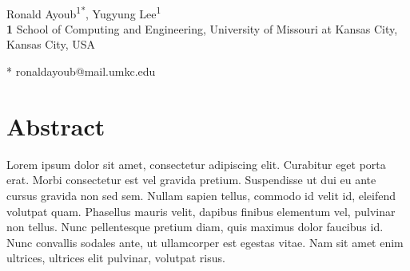 \documentclass[10pt,letterpaper]{article}
\begin{document}
\vspace*{0.2in}

\begin{flushleft}
{\Large
\textbf{} %
}
\newline
\\
Ronald Ayoub\textsuperscript{1*},
Yugyung Lee\textsuperscript{1}
\\
\bigskip
\textbf{1} School of Computing and Engineering, University of Missouri at Kansas City, Kansas City, USA
\\
\bigskip

% 
%





* ronaldayoub@mail.umkc.edu

\end{flushleft}
\section*{Abstract}
Lorem ipsum dolor sit amet, consectetur adipiscing elit. Curabitur eget porta erat. Morbi consectetur est vel gravida pretium. Suspendisse ut dui eu ante cursus gravida non sed sem. Nullam sapien tellus, commodo id velit id, eleifend volutpat quam. Phasellus mauris velit, dapibus finibus elementum vel, pulvinar non tellus. Nunc pellentesque pretium diam, quis maximus dolor faucibus id. Nunc convallis sodales ante, ut ullamcorper est egestas vitae. Nam sit amet enim ultrices, ultrices elit pulvinar, volutpat risus.
\end{document}
